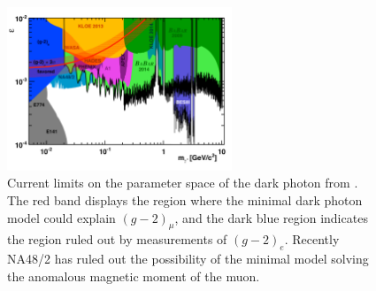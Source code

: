 \begin{figure}[h]
    \centering
    \includegraphics[width = 0.6\textwidth]{Figures/limits/darkphoton_limits}
    \caption{Current limits on the parameter space of the dark photon from \cite{Soffer:2015kpa}. The red band displays the region where the minimal dark photon model could explain $(g-2)_\mu$, and the dark blue region indicates the region ruled out by measurements of $(g-2)_e$. Recently NA48/2 has ruled out the possibility of the minimal model solving the anomalous magnetic moment of the muon.}
    \label{fig:darkphoton_limits}
\end{figure}

